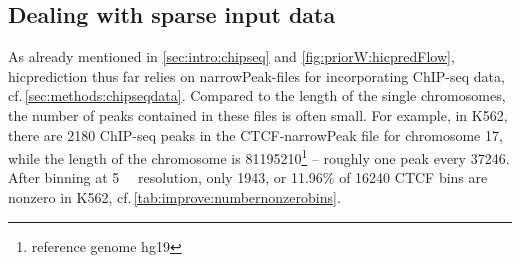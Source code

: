 \subsection{Dealing with sparse input data} \label{sec:improve:peakDensity}
As already mentioned in \autoref{sec:intro:chipseq} and \autoref{fig:priorW:hicpredFlow}, 
hicprediction thus far relies on narrowPeak-files for incorporating ChIP-seq data, cf.\,\autoref{sec:methods:chipseqdata}.
Compared to the length of the single chromosomes, 
the number of peaks contained in these files is often small.
For example, in K562, there are 2180 ChIP-seq peaks in the CTCF-narrowPeak file for chromosome 17, 
while the length of the chromosome is \SI{81195210}{\bp}\footnote{reference genome hg19} -- roughly one peak every \SI{37246}{\bp}.
After binning at \SI{5}{\kilo\bp} resolution, only 1943, or 11.96\% of \num{16240} CTCF bins are nonzero in K562, 
cf.\,\autoref{tab:improve:numbernonzerobins}.
